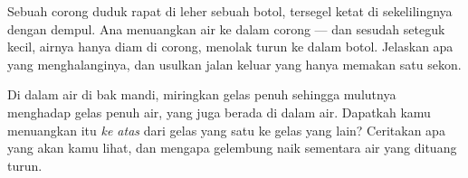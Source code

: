 \begin{exercise}[$\star\star$]\label{exo:g2:air-around-us:9}
Sebuah corong duduk rapat di leher sebuah botol, tersegel ketat di
sekelilingnya dengan dempul. Ana menuangkan air ke dalam corong ---
dan sesudah seteguk kecil, airnya hanya diam di corong, menolak turun
ke dalam botol. Jelaskan apa yang menghalanginya, dan usulkan jalan
keluar yang hanya memakan satu sekon.
\end{exercise}

\begin{exercise}[$\star\star$]\label{exo:g2:air-around-us:10}
Di dalam air di bak mandi, miringkan gelas penuh  sehingga
mulutnya menghadap gelas penuh air, yang juga berada di dalam air.
Dapatkah kamu menuangkan  itu \emph{ke atas} dari gelas yang satu
ke gelas yang lain? Ceritakan apa yang akan kamu lihat, dan mengapa
gelembung naik sementara air yang dituang turun.
\end{exercise}
